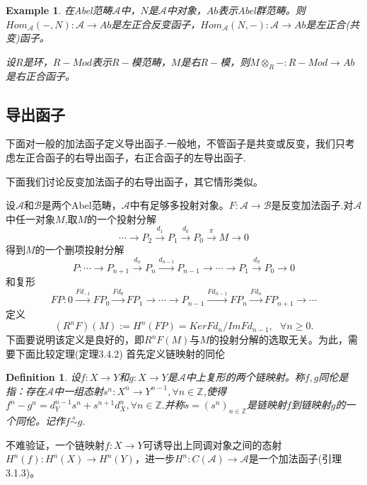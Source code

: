 \documentclass[UTF8]{article}
\newtheorem{defn}{Definition}[section]
\newtheorem{exa}{Example}[section]
\begin{document}
\begin{exa}
	在Abel范畴$\mathcal{A}$中，$N$是$\mathcal{A}$中对象，$Ab$表示Abel群范畴。则$Hom_{\mathcal{A}}(-,N):\mathcal{A}\rightarrow Ab$是左正合反变函子，$Hom_{\mathcal{A}}(N,-):\mathcal{A}\rightarrow Ab$是左正合(共变)函子。
	
	设$R$是环，$R-Mod$表示$R-$模范畴，$M$是右$R-$模，则$M\otimes_{R}-:R-Mod\rightarrow Ab$是右正合函子。
\end{exa}
\subsection{导出函子}
下面对一般的加法函子定义导出函子.一般地，不管函子是共变或反变，我们只考虑左正合函子的右导出函子，右正合函子的左导出函子.

下面我们讨论反变加法函子的右导出函子，其它情形类似。

设$\mathcal{A}$和$\mathcal{B}$是两个Abel范畴，$\mathcal{A}$中有足够多投射对象。$F:\mathcal{A}\rightarrow\mathcal{B}$是反变加法函子.对$\mathcal{A}$中任一对象$M$,取$M$的一个投射分解
$$
\cdots\rightarrow P_{2}\stackrel{d_{1}}{\rightarrow}P_{1}\stackrel{d_{0}}{\rightarrow}P_{0}\stackrel{\pi}{\rightarrow}M\rightarrow 0
$$
得到$M$的一个删项投射分解
$$
P:\cdots\rightarrow P_{n+1}\stackrel{d_{n}}{\longrightarrow}P_{n}\stackrel{d_{n-1}}{\longrightarrow}P_{n-1}\rightarrow \cdots\rightarrow P_{1}\stackrel{d_{0}}{\longrightarrow}P_{0}\rightarrow 0
$$
和复形
$$
FP:0\stackrel{Fd_{-1}}{\longrightarrow} FP_{0}\stackrel{Fd_{0}}{\longrightarrow}FP_{1}\rightarrow\cdots\rightarrow P_{n-1}\stackrel{Fd_{n-1}}{\longrightarrow}  FP_{n}\stackrel{Fd_{n}}{\longrightarrow}FP_{n+1}\rightarrow\cdots
$$
定义$$(R^{n}F)(M):=H^{n}(FP)=KerFd_{n}/ImFd_{n-1},\ \ \ \forall n\geq 0.$$
下面要说明该定义是良好的，即$R^{n}F(M)$与$M$的投射分解的选取无关。为此，需要下面比较定理(\cite{zh}定理3.4.2)
首先定义链映射的同伦
\begin{defn}
	设$f:X\rightarrow Y$和$g:X\rightarrow Y$是$\mathcal{A}$中上复形的两个链映射。称$f,g$同伦是指：存在$\mathcal{A}$中一组态射$s^{n}:X^{n}\rightarrow Y^{n-1},\forall n\in \mathbb{Z}$,使得$f^{n}-g^{n}=d_{Y}^{n-1}s^{n}+s^{n+1}d_{X}^{n},\forall n\in\mathbb{Z}.$并称$s=(s^{n})_{n\in\mathbb{Z}}$是链映射$f$到链映射$g$的一个同伦。记作$f\stackrel{s}{\sim}g.$
\end{defn}
不难验证，一个链映射$f:X\rightarrow Y$可诱导出上同调对象之间的态射$H^{n}(f):H^{n}(X)\rightarrow H^{n}(Y)$，进一步$H^{n}:C(\mathcal{A})\rightarrow \mathcal{A}$是一个加法函子(\cite{zh}引理3.1.3)。
\end{document}
